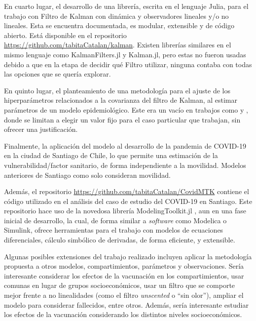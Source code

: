 \begin{conclusion}
En cuarto lugar, el desarrollo de una librería, escrita en el lenguaje Julia, para el trabajo con Filtro de Kalman con dinámica y observadores lineales y/o no lineales. Esta se encuentra documentada, es modular, extensible y de código abierto. Está disponible en el repositorio \url{https://github.com/tabitaCatalan/kalman}. Existen librerías similares en el mismo lenguaje como KalmanFilters.jl y Kalman.jl, pero estas no fueron usadas debido a que en la etapa de decidir qué Filtro utilizar, ninguna contaba con todas las opciones que se quería explorar. 

En quinto lugar, el planteamiento de una metodología para el ajuste de los hiperparámetros relacionados a la covarianza del filtro de Kalman, al estimar parámetros de un modelo epidemiológico. Este era un vacío en trabajos como \cite{Hasan2020} y \cite{Sameni2020}, donde se limitan a elegir un valor fijo para el caso particular que trabajan, sin ofrecer una justificación.

Finalmente, la aplicación del modelo al desarrollo de la pandemia de COVID-19 en la ciudad de Santiago de Chile, lo que permite una estimación de la vulnerabilidad/factor sanitario, de forma independiente a la movilidad. Modelos anteriores de Santiago como \cite{Gozzi2021} solo consideran movilidad. 

Además, el repositorio \url{https://github.com/tabitaCatalan/CovidMTK} contiene el código utilizado en el análisis del caso de estudio del COVID-19 en Santiago. Este repositorio hace uso de la novedosa librería ModelingToolkit.jl \cite{ma2021modelingtoolkit}, aun en una fase inicial de desarrollo, la cual, de forma similar a \textit{software} como Modelica o Simulink, ofrece herramientas para el trabajo con modelos de ecuaciones diferenciales, cálculo simbólico de derivadas, de forma eficiente, y extensible. 

Algunas posibles extensiones del trabajo realizado incluyen aplicar la metodología propuesta a otros modelos, compartimientos, parámetros y observaciones. Sería interesante considerar los efectos de la vacunación en los compartimientos, usar comunas en lugar de grupos socioeconómicos, usar un filtro que se comporte mejor frente a no linealidades (como el filtro \textit{unscented} o ``sin olor''), ampliar el modelo para considerar fallecidos, entre otros. Además, sería interesante estudiar los efectos de la vacunación considerando los distintos niveles socioeconómicos.




\end{conclusion}